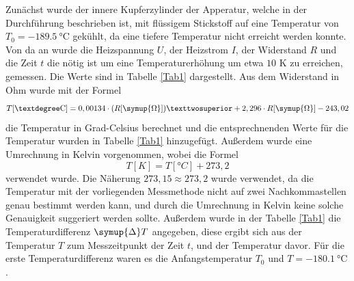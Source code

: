 
Zunächst wurde der innere Kupferzylinder der Apperatur, welche in der Durchführung beschrieben ist, mit 
flüssigem Stickstoff auf eine Temperatur von $T_0 = \SI{-189,5}{\celsius}$ gekühlt, da eine tiefere Temperatur 
nicht erreicht werden konnte. Von da an wurde die Heizspannung $U$, der Heizstrom $I$, der Widerstand $R$ 
und die Zeit $t$ die nötig ist um eine Temperaturerhöhung um etwa $10$ K zu erreichen, gemessen. Die Werte sind in Tabelle \ref{Tab1} 
dargestellt. Aus dem Widerstand in Ohm wurde mit der Formel 
\begin{equation*}
    T[\si{°C}] = 0,00134 \cdot (R[\symup{\Omega}])² + 2,296 \cdot R[\symup{\Omega}] -243,02
\end{equation*}
die Temperatur in Grad-Celsius berechnet und die entsprechnenden Werte für die Temperatur wurden 
in Tabelle \ref{Tab1} hinzugefügt. Außerdem wurde eine Umrechnung in Kelvin vorgenommen, 
wobei die Formel 
\begin{equation*}
    T[\si{K}] = T[\si{°C}] + 273,2
\end{equation*}
verwendet wurde. Die Näherung $273,15 \approx 273,2$ wurde verwendet, da die Temperatur mit der vorliegenden 
Messmethode nicht auf zwei Nachkommastellen genau bestimmt werden kann, und durch die Umrechnung in Kelvin 
keine solche Genauigkeit suggeriert werden sollte. 
Außerdem wurde in der Tabelle \ref{Tab1} die Temperaturdifferenz $\symup{\Delta}T$ angegeben, diese ergibt 
sich aus der Temperatur $T$ zum Messzeitpunkt der Zeit $t$, und der Temperatur davor. Für die erste 
Temperaturdifferenz waren es die Anfangstemperatur $T_0$ und $T=\SI{-180,1}{\celsius}$. 

